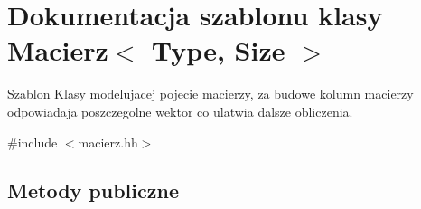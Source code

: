 \hypertarget{class_macierz}{}\section{Dokumentacja szablonu klasy Macierz$<$ Type, Size $>$}
\label{class_macierz}


Szablon Klasy modelujacej pojecie macierzy, za budowe kolumn macierzy odpowiadaja poszczegolne wektor co ulatwia dalsze obliczenia.  




{\ttfamily \#include $<$macierz.\+hh$>$}

\subsection*{Metody publiczne}
